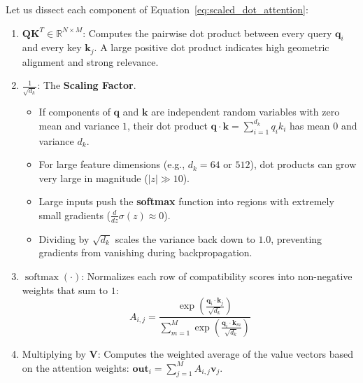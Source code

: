 Let us dissect each component of Equation~\eqref{eq:scaled_dot_attention}:
\begin{enumerate}
    \item $\mathbf{Q}\mathbf{K}^T \in \mathbb{R}^{N \times M}$: Computes the pairwise dot product between every query $\mathbf{q}_i$ and every key $\mathbf{k}_j$. A large positive dot product indicates high geometric alignment and strong relevance.
    \item $\frac{1}{\sqrt{d_k}}$: The \textbf{Scaling Factor}.
    \begin{itemize}
        \item If components of $\mathbf{q}$ and $\mathbf{k}$ are independent random variables with zero mean and variance $1$, their dot product $\mathbf{q} \cdot \mathbf{k} = \sum_{i=1}^{d_k} q_i k_i$ has mean $0$ and variance $d_k$.
        \item For large feature dimensions (e.g., $d_k = 64$ or $512$), dot products can grow very large in magnitude ($|z| \gg 10$).
        \item Large inputs push the \textbf{softmax} function into regions with extremely small gradients ($\frac{d}{dz}\sigma(z) \approx 0$).
        \item Dividing by $\sqrt{d_k}$ scales the variance back down to $1.0$, preventing gradients from vanishing during backpropagation.
    \end{itemize}
    \item $\operatorname{softmax}(\cdot)$: Normalizes each row of compatibility scores into non-negative weights that sum to $1$:
    \begin{equation}
    A_{i, j} = \frac{\exp\left(\frac{\mathbf{q}_i \cdot \mathbf{k}_j}{\sqrt{d_k}}\right)}{\sum_{m=1}^M \exp\left(\frac{\mathbf{q}_i \cdot \mathbf{k}_m}{\sqrt{d_k}}\right)}\label{eq:attention_weights}
    \end{equation}
    \item Multiplying by $\mathbf{V}$: Computes the weighted average of the value vectors based on the attention weights: $\mathbf{out}_i = \sum_{j=1}^M A_{i, j} \mathbf{v}_j$.
\end{enumerate}

